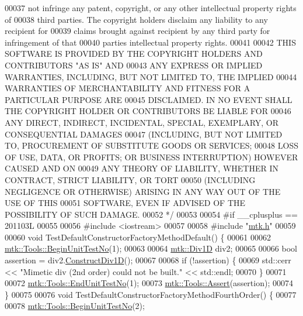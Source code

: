 \begin{DoxyCode}
00037 \textcolor{comment}{not infringe any patent, copyright, or any other intellectual property rights of}
00038 \textcolor{comment}{third parties. The copyright holders disclaim any liability to any recipient for}
00039 \textcolor{comment}{claims brought against recipient by any third party for infringement of that}
00040 \textcolor{comment}{parties intellectual property rights.}
00041 \textcolor{comment}{}
00042 \textcolor{comment}{THIS SOFTWARE IS PROVIDED BY THE COPYRIGHT HOLDERS AND CONTRIBUTORS "AS IS" AND}
00043 \textcolor{comment}{ANY EXPRESS OR IMPLIED WARRANTIES, INCLUDING, BUT NOT LIMITED TO, THE IMPLIED}
00044 \textcolor{comment}{WARRANTIES OF MERCHANTABILITY AND FITNESS FOR A PARTICULAR PURPOSE ARE}
00045 \textcolor{comment}{DISCLAIMED. IN NO EVENT SHALL THE COPYRIGHT HOLDER OR CONTRIBUTORS BE LIABLE FOR}
00046 \textcolor{comment}{ANY DIRECT, INDIRECT, INCIDENTAL, SPECIAL, EXEMPLARY, OR CONSEQUENTIAL DAMAGES}
00047 \textcolor{comment}{(INCLUDING, BUT NOT LIMITED TO, PROCUREMENT OF SUBSTITUTE GOODS OR SERVICES;}
00048 \textcolor{comment}{LOSS OF USE, DATA, OR PROFITS; OR BUSINESS INTERRUPTION) HOWEVER CAUSED AND ON}
00049 \textcolor{comment}{ANY THEORY OF LIABILITY, WHETHER IN CONTRACT, STRICT LIABILITY, OR TORT}
00050 \textcolor{comment}{(INCLUDING NEGLIGENCE OR OTHERWISE) ARISING IN ANY WAY OUT OF THE USE OF THIS}
00051 \textcolor{comment}{SOFTWARE, EVEN IF ADVISED OF THE POSSIBILITY OF SUCH DAMAGE.}
00052 \textcolor{comment}{*/}
00053 
00054 \textcolor{preprocessor}{#if \_\_cplusplus == 201103L}
00055 
00056 \textcolor{preprocessor}{#include <iostream>}
00057 
00058 \textcolor{preprocessor}{#include "\hyperlink{mtk_8h}{mtk.h}"}
00059 
00060 \textcolor{keywordtype}{void} TestDefaultConstructorFactoryMethodDefault() \{
00061 
00062   \hyperlink{classmtk_1_1Tools_afc29ecaf337a13ed2e817d3890a5a441}{mtk::Tools::BeginUnitTestNo}(1);
00063 
00064   \hyperlink{classmtk_1_1Div1D}{mtk::Div1D} div2;
00065 
00066   \textcolor{keywordtype}{bool} assertion = div2.\hyperlink{classmtk_1_1Div1D_a52fcd1542f11e606e36bd188e48bfdf7}{ConstructDiv1D}();
00067 
00068   \textcolor{keywordflow}{if} (!assertion) \{
00069     std::cerr << \textcolor{stringliteral}{"Mimetic div (2nd order) could not be built."} << std::endl;
00070   \}
00071 
00072   \hyperlink{classmtk_1_1Tools_aba67d9dc35c9c1c49430fcc9ea035e03}{mtk::Tools::EndUnitTestNo}(1);
00073   \hyperlink{classmtk_1_1Tools_ac6804df469c94ab6a796fb64f1e44a89}{mtk::Tools::Assert}(assertion);
00074 \}
00075 
00076 \textcolor{keywordtype}{void} TestDefaultConstructorFactoryMethodFourthOrder() \{
00077 
00078   \hyperlink{classmtk_1_1Tools_afc29ecaf337a13ed2e817d3890a5a441}{mtk::Tools::BeginUnitTestNo}(2);

\end{DoxyCode}
